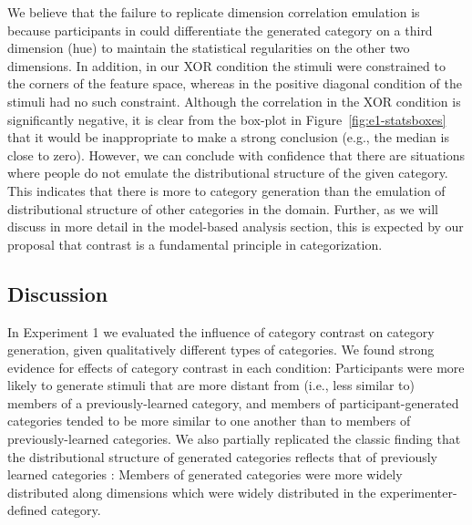 \documentclass[12pt]{article}
\begin{document}
\begin{flushleft}
We believe that the failure to replicate dimension correlation emulation is
because participants in \cite{jern2013probabilistic} could differentiate the
generated category on a third dimension (hue) to maintain the statistical
regularities on the other two dimensions. In addition, in our XOR condition the
stimuli were constrained to the corners of the feature space, whereas in the
positive diagonal condition of \cite{jern2013probabilistic} the stimuli had no
such constraint. Although the correlation in the XOR condition is significantly
negative, it is clear from the box-plot in Figure~\ref{fig:e1-statsboxes} that
it would be inappropriate to make a strong conclusion (e.g., the median is close
to zero). However, we can conclude with confidence that there are situations
where people do not emulate the distributional structure of the given category.
This indicates that there is more to category generation than the emulation of
distributional structure of other categories in the domain. Further, as we will
discuss in more detail in the model-based analysis section, this is expected by
our proposal that contrast is a fundamental principle in categorization.


\subsection{Discussion} In Experiment 1 we evaluated the influence of category
contrast on category generation, given qualitatively different types of
categories. We found strong evidence for effects of category contrast in each
condition: Participants were more likely to generate stimuli that are more
distant from (i.e., less similar to) members of a previously-learned category,
and members of participant-generated categories tended to be more similar to one
another than to members of previously-learned categories. We also partially
replicated the classic finding that the distributional structure of generated
categories reflects that of previously learned categories
\citep{jern2013probabilistic,ward1994structured}: Members of generated
categories were more widely distributed along dimensions which were widely
distributed in the experimenter-defined category.


\end{flushleft}
\end{document}
